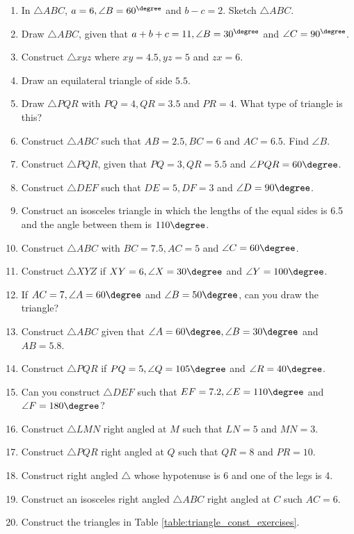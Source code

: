 \begin{enumerate}[label=\thesubsection.\arabic*.,ref=\thesubsection.\theenumi]
\item In $\triangle ABC$,  $a = 6, \angle B = 60^{\degree}$ and $b-c = 2$. 
Sketch $\triangle ABC$.
\item Draw $\triangle ABC$,  given that $a+b+c = 11, \angle B = 30^{\degree}$ and $\angle C = 90^{\degree}$.
\item Construct $\triangle xyz$ where $xy = 4.5, yz = 5$ and $zx = 6$.
\item Draw an equilateral triangle of side $5.5$.
\item Draw $\triangle PQR$ with $PQ = 4, QR = 3.5$ and $PR = 4$.  What type of triangle is this?
\item Construct $\triangle ABC$ such that $AB = 2.5, BC = 6$ and $AC = 6.5$.  Find $\angle B$.
\item Construct $\triangle PQR$, given that $PQ = 3, QR = 5.5$ and $\angle PQR = 60 \degree$.
\item Construct $\triangle DEF$ such that $DE = 5, DF = 3$ and $\angle D = 90\degree$.
\item Construct an isosceles triangle in which the lengths of the equal sides is 6.5 and the angle between them is $110\degree$.
\item Construct $\triangle ABC$  with $BC = 7.5, AC = 5$ and $\angle C = 60\degree$.
\item Construct $\triangle XYZ$ if $XY = 6, \angle X = 30\degree$ and $\angle Y = 100 \degree$.
\item If $AC = 7, \angle A = 60\degree$ and $\angle B = 50 \degree$, can you draw the triangle?
\item Construct $\triangle ABC$ given that $\angle A = 60\degree, \angle B = 30\degree$ and $AB = 5.8$.
\item Construct $\triangle PQR$ if $PQ = 5, \angle Q = 105 \degree$ and $\angle R = 40 \degree$.
\item Can you construct $\triangle DEF$ such that $EF = 7.2, \angle E = 110\degree$ and $\angle F = 180\degree$?
\item Construct  $\triangle LMN$ right angled at $M$ such that $LN = 5$ and $MN = 3$.
\item Construct  $\triangle PQR$ right angled at $Q$ such that $QR = 8$ and $PR = 10$.
\item Construct  right angled $\triangle $ whose hypotenuse  is 6 and one of the legs is 4.
\item Construct  an isosceles right angled $\triangle ABC$ right angled at $C$ such $AC = 6$.
\item Construct the  triangles in Table \ref{table:triangle_const_exercises}.
\begin{table}[!ht]

\caption{}
\label{table:triangle_const_exercises}
\end{table}

\end{enumerate}
%
